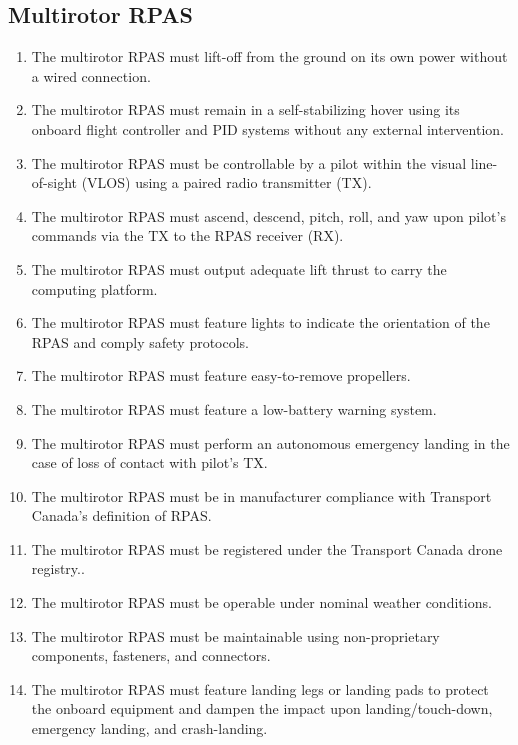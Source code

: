 \documentclass[10pt,letterpaper]{article}
\begin{document}
\subsection{Multirotor RPAS}
\begin{enumerate}[label=F.DR.\arabic*, wide=1cm, widest=3cm, leftmargin=*, font=\bfseries, noitemsep,topsep=0pt, parsep=4pt, partopsep=0pt]
	\item The multirotor RPAS must lift-off from the ground on its own power without a wired connection.
	\item The multirotor RPAS must remain in a self-stabilizing hover using its onboard flight controller and PID systems without any external intervention.
	\item The multirotor RPAS must be controllable by a pilot within the visual line-of-sight (VLOS) using a paired radio transmitter (TX).
	\item The multirotor RPAS must ascend, descend, pitch, roll, and yaw upon pilot's commands via the TX to the RPAS receiver (RX).
	\item The multirotor RPAS must output adequate lift thrust to carry the computing platform.
	\item The multirotor RPAS must feature lights to indicate the orientation of the RPAS and comply safety protocols.
	\item The multirotor RPAS must feature easy-to-remove propellers.
	\item The multirotor RPAS must feature a low-battery warning system.
	\item The multirotor RPAS must perform an autonomous emergency landing in the case of loss of contact with pilot's TX.
	\item The multirotor RPAS must be in manufacturer compliance with Transport Canada's definition of RPAS\cite{tp15263}.
	\item The multirotor RPAS must be registered under the Transport Canada drone registry.\cite{tcdronereg}.
	\item The multirotor RPAS must be operable under nominal weather conditions.
	\item The multirotor RPAS must be maintainable using non-proprietary components, fasteners, and connectors.
	\item The multirotor RPAS must feature landing legs or landing pads to protect the onboard equipment and dampen the impact upon landing/touch-down, emergency landing, and crash-landing.
\end{enumerate}
\end{document}
